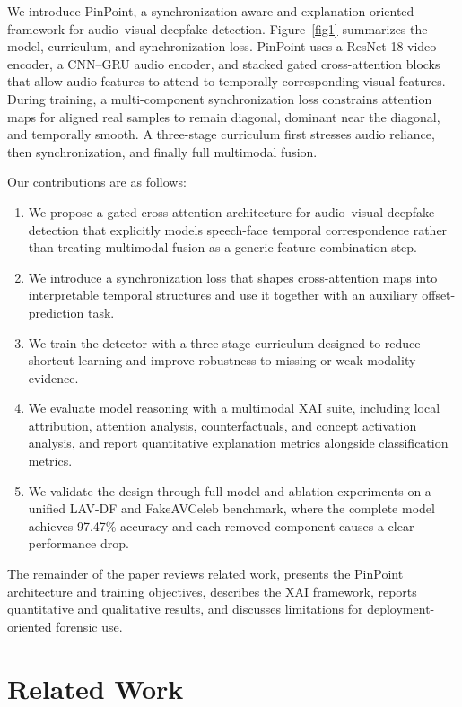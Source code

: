 \documentclass[pdflatex,sn-mathphys-num]{sn-jnl}
\begin{document}
We introduce PinPoint, a synchronization-aware and explanation-oriented framework for audio--visual deepfake detection. Figure~\ref{fig1} summarizes the model, curriculum, and synchronization loss. PinPoint uses a ResNet-18 video encoder, a CNN--GRU audio encoder, and stacked gated cross-attention blocks that allow audio features to attend to temporally corresponding visual features. During training, a multi-component synchronization loss constrains attention maps for aligned real samples to remain diagonal, dominant near the diagonal, and temporally smooth. A three-stage curriculum first stresses audio reliance, then synchronization, and finally full multimodal fusion.

Our contributions are as follows:
\begin{enumerate}
\item We propose a gated cross-attention architecture for audio--visual deepfake detection that explicitly models speech-face temporal correspondence rather than treating multimodal fusion as a generic feature-combination step.
\item We introduce a synchronization loss that shapes cross-attention maps into interpretable temporal structures and use it together with an auxiliary offset-prediction task.
\item We train the detector with a three-stage curriculum designed to reduce shortcut learning and improve robustness to missing or weak modality evidence.
\item We evaluate model reasoning with a multimodal XAI suite, including local attribution, attention analysis, counterfactuals, and concept activation analysis, and report quantitative explanation metrics alongside classification metrics.
\item We validate the design through full-model and ablation experiments on a unified LAV-DF and FakeAVCeleb benchmark, where the complete model achieves 97.47\% accuracy and each removed component causes a clear performance drop.
\end{enumerate}

The remainder of the paper reviews related work, presents the PinPoint architecture and training objectives, describes the XAI framework, reports quantitative and qualitative results, and discusses limitations for deployment-oriented forensic use.


\section{Related Work}\label{sec2}
\end{document}
